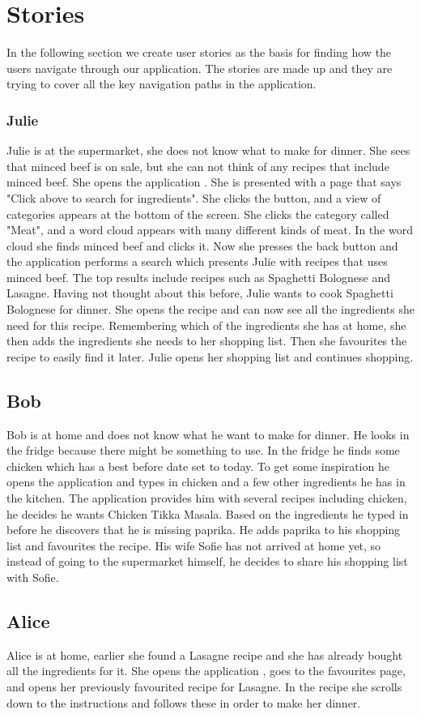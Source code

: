 \section{Stories}
In the following section we create user stories as the basis for finding how the users navigate through our application. The stories are made up and they are trying to cover all the key navigation paths in the application.

\subsubsection*{Julie}

Julie is at the supermarket, she does not know what to make for dinner. She sees that minced beef is on sale, but she can not think of any recipes that include minced beef. She opens the application \appname. She is presented with a page that says "Click above to search for ingredients". She clicks the button, and a view of categories appears at the bottom of the screen. She clicks the category called "Meat", and a word cloud appears with many different kinds of meat. In the word cloud she finds minced beef and clicks it. Now she presses the back button and the application performs a search which presents Julie with recipes that uses minced beef. The top results include recipes such as Spaghetti Bolognese and Lasagne. Having not thought about this before, Julie wants to cook Spaghetti Bolognese for dinner. She opens the recipe and can now see all the ingredients she need for this recipe. Remembering which of the ingredients she has at home, she then adds the ingredients she needs to her shopping list. Then she favourites the recipe to easily find it later. Julie opens her shopping list and continues shopping.

\subsection*{Bob}
Bob is at home and does not know what he want to make for dinner. He looks in the fridge because there might be something to use. In the fridge he finds some chicken which has a best before date set to today. To get some inspiration he opens the application and types in chicken and a few other ingredients he has in the kitchen. The application provides him with several recipes including chicken, he decides he wants Chicken Tikka Masala. Based on the ingredients he typed in before he discovers that he is missing paprika. He adds paprika to his shopping list and favourites the recipe. His wife Sofie has not arrived at home yet, so instead of going to the supermarket himself, he decides to share his shopping list with Sofie.

\subsection*{Alice}
Alice is at home, earlier she found a Lasagne recipe and she has already bought all the ingredients for it. She opens the application \appname, goes to the favourites page, and opens her previously favourited recipe for Lasagne. In the recipe she scrolls down to the instructions and follows these in order to make her dinner.
